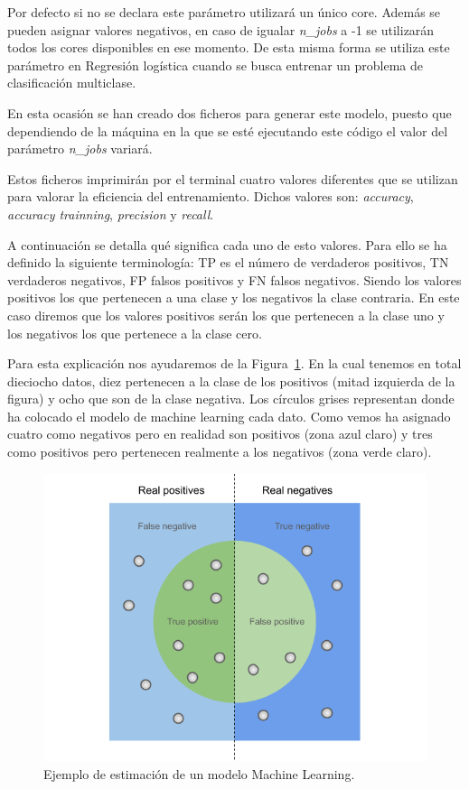 \documentclass[a4paper, 12pt]{book}
\begin{document}
\begin{itemize}
Por defecto si no se declara este parámetro utilizará un único core. Además se pueden asignar valores negativos, en caso de igualar \textit{n\_jobs} a -1 se utilizarán todos los cores disponibles en ese momento. De esta misma forma se utiliza este parámetro en Regresión logística cuando se busca entrenar un problema de clasificación multiclase.

En esta ocasión se han creado dos ficheros para generar este modelo, puesto que dependiendo de la máquina en la que se esté ejecutando este código el valor del parámetro \textit{n\_jobs} variará. 

\end{itemize}

Estos ficheros imprimirán por el terminal cuatro valores diferentes que se utilizan para valorar la eficiencia del entrenamiento. Dichos valores son: \textit{accuracy}, \textit{accuracy trainning}, \textit{precision} y \textit{recall}. 

A continuación se detalla qué significa cada uno de esto valores. Para ello se ha definido la siguiente terminología: TP es el número de verdaderos positivos, TN verdaderos negativos, FP falsos positivos y FN falsos negativos. Siendo los valores positivos los que pertenecen a una clase y los negativos la clase contraria. En este caso diremos que los valores positivos serán los que pertenecen a la clase uno y los negativos los que pertenece a la clase cero. 

Para esta explicación nos ayudaremos de la Figura~\ref{fig:explicacion_acc}. En la cual tenemos en total dieciocho datos, diez pertenecen a la clase de los positivos (mitad izquierda de la figura) y ocho que son de la clase negativa. Los círculos grises representan donde ha colocado el modelo de machine learning cada dato. Como vemos ha asignado cuatro como negativos pero en realidad son positivos (zona azul claro) y tres como positivos pero pertenecen realmente a los negativos (zona verde claro).

\begin{figure}[]
  \centering
  \includegraphics[width=12cm, keepaspectratio]{img/explicacion_acc.png}
  \caption{Ejemplo de estimación de un modelo Machine Learning.}\label{fig:explicacion_acc}
\end{figure}
\end{document}
